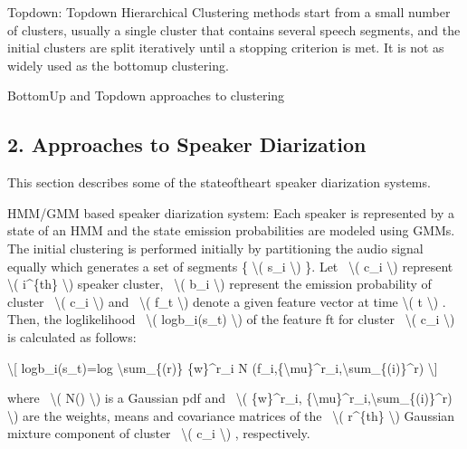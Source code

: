 \documentclass[letterpaper,10pt,english]{jupyterBook}
\begin{document}
\sphinxAtStartPar
Top\sphinxhyphen{}down: Top\sphinxhyphen{}down Hierarchical Clustering methods start from a small
number of clusters, usually a single cluster that contains several
speech segments, and the initial clusters are split iteratively until a
stopping criterion is met. It is not as widely used as the bottom\sphinxhyphen{}up
clustering.

\sphinxAtStartPar
Bottom\sphinxhyphen{}Up and Top\sphinxhyphen{}down approaches to clustering


\subsection{2. Approaches to Speaker Diarization}
\label{\detokenize{Recognition/Speaker_Diarization:approaches-to-speaker-diarization}}
\sphinxAtStartPar
This section describes some of the state\sphinxhyphen{}of\sphinxhyphen{}the\sphinxhyphen{}art speaker diarization
systems.

\sphinxAtStartPar
HMM/GMM based speaker diarization system: Each speaker is represented by
a state of an HMM and the state emission probabilities are modeled using
GMMs. The initial clustering is performed initially by partitioning the
audio signal equally which generates a set of segments \{ \textbackslash{}( s\_i \textbackslash{}) \}.
Let  \textbackslash{}( c\_i \textbackslash{}) represent  \textbackslash{}( i\textasciicircum{}\{th\} \textbackslash{}) speaker cluster,  \textbackslash{}( b\_i \textbackslash{})
represent the emission probability of cluster  \textbackslash{}( c\_i \textbackslash{}) and  \textbackslash{}( f\_t
\textbackslash{}) denote a given feature vector at time \textbackslash{}( t \textbackslash{}) . Then, the
log\sphinxhyphen{}likelihood  \textbackslash{}( logb\_i(s\_t) \textbackslash{}) of the feature ft for cluster  \textbackslash{}(
c\_i \textbackslash{}) is calculated as follows:

\sphinxAtStartPar
\textbackslash{}{[} logb\_i(s\_t)=log \textbackslash{}sum\_\{(r)\} \{w\}\textasciicircum{}r\_i N
(f\_i,\{\textbackslash{}mu\}\textasciicircum{}r\_i,\textbackslash{}sum\_\{(i)\}\textasciicircum{}r) \textbackslash{}{]}

\sphinxAtStartPar
where  \textbackslash{}( N() \textbackslash{}) is a Gaussian pdf and  \textbackslash{}( \{w\}\textasciicircum{}r\_i,
\{\textbackslash{}mu\}\textasciicircum{}r\_i,\textbackslash{}sum\_\{(i)\}\textasciicircum{}r) \textbackslash{}) are the weights, means and covariance
matrices of the  \textbackslash{}( r\textasciicircum{}\{th\} \textbackslash{}) Gaussian mixture component of cluster 
\textbackslash{}( c\_i \textbackslash{}) , respectively.
\end{document}
